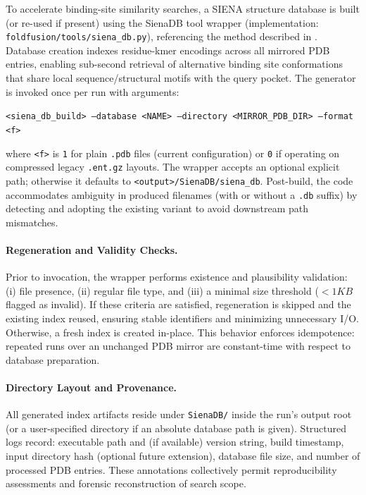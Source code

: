 To accelerate binding-site similarity searches, a SIENA structure database is built (or re-used if present) using the SienaDB tool wrapper (implementation: \texttt{foldfusion/tools/siena\_db.py}), referencing the method described in \cite{bietzSIENAEfficientCompilation2016}. Database creation indexes residue-kmer encodings across all mirrored PDB entries, enabling sub-second retrieval of alternative binding site conformations that share local sequence/structural motifs with the query pocket. The generator is invoked once per run with arguments:
\begin{center}
    \texttt{<siena\_db\_build> --database <NAME> --directory <MIRROR\_PDB\_DIR> --format <f>}
\end{center}
where \texttt{<f>} is \texttt{1} for plain \texttt{.pdb} files (current configuration) or \texttt{0} if operating on compressed legacy \texttt{.ent.gz} layouts. The wrapper accepts an optional explicit path; otherwise it defaults to \texttt{<output>/SienaDB/siena\_db}. Post-build, the code accommodates ambiguity in produced filenames (with or without a \texttt{.db} suffix) by detecting and adopting the existing variant to avoid downstream path mismatches.

\paragraph{Regeneration and Validity Checks.} Prior to invocation, the wrapper performs existence and plausibility validation: (i) file presence, (ii) regular file type, and (iii) a minimal size threshold ($ < 1 KB$ flagged as invalid). If these criteria are satisfied, regeneration is skipped and the existing index reused, ensuring stable identifiers and minimizing unnecessary I/O. Otherwise, a fresh index is created in-place. This behavior enforces idempotence: repeated runs over an unchanged PDB mirror are constant-time with respect to database preparation.

\paragraph{Directory Layout and Provenance.} All generated index artifacts reside under \texttt{SienaDB/} inside the run's output root (or a user-specified directory if an absolute database path is given). Structured logs record: executable path and (if available) version string, build timestamp, input directory hash (optional future extension), database file size, and number of processed PDB entries. These annotations collectively permit reproducibility assessments and forensic reconstruction of search scope.


